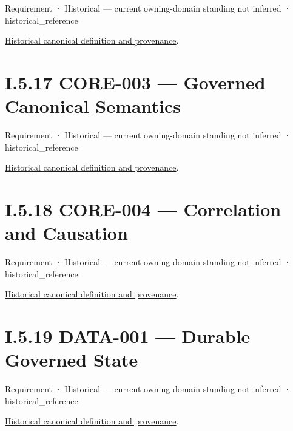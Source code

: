 \label{element:a5c09af151984e989590b9198e2def70}
{\small Requirement · Historical — current owning-domain standing not inferred · historical\_reference}\par
\href{../../../../continuum/motivation/requirement/a5c09af151984e989590b9198e2def70.md}{Historical canonical definition and provenance}.\par
\section*{I.5.17 CORE-003 — Governed Canonical Semantics}
\label{navigation:I.5.17}

\label{element:006383a5cce64780960fda32b6682d8d}
{\small Requirement · Historical — current owning-domain standing not inferred · historical\_reference}\par
\href{../../../../continuum/motivation/requirement/006383a5cce64780960fda32b6682d8d.md}{Historical canonical definition and provenance}.\par
\section*{I.5.18 CORE-004 — Correlation and Causation}
\label{navigation:I.5.18}

\label{element:f2e504e7d6374e41a81303265adda6de}
{\small Requirement · Historical — current owning-domain standing not inferred · historical\_reference}\par
\href{../../../../continuum/motivation/requirement/f2e504e7d6374e41a81303265adda6de.md}{Historical canonical definition and provenance}.\par
\section*{I.5.19 DATA-001 — Durable Governed State}
\label{navigation:I.5.19}

\label{element:15c71ccd5d714503891aece2a23445e1}
{\small Requirement · Historical — current owning-domain standing not inferred · historical\_reference}\par
\href{../../../../continuum/motivation/requirement/15c71ccd5d714503891aece2a23445e1.md}{Historical canonical definition and provenance}.\par
